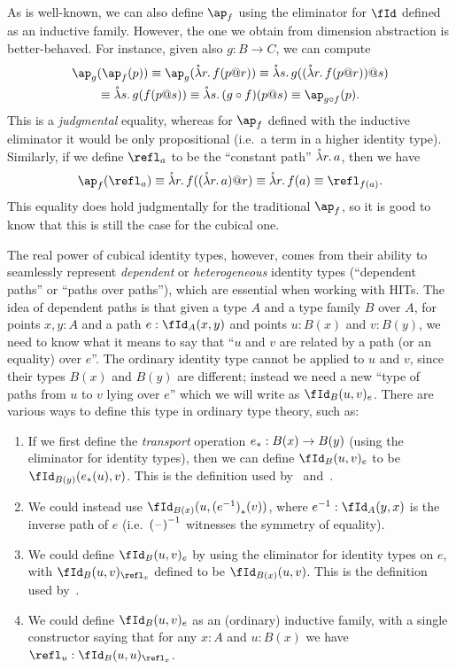 \documentclass{amsart}
\begin{document}
As is well-known, we can also define $\ap_f$ using the eliminator for $\fId$ defined as an inductive family.
However, the one we obtain from dimension abstraction is better-behaved.
For instance, given also $g:B\to C$, we can compute
\begin{multline*}
\ap_g (\ap_f(p))
\jdeq \ap_g(\dlam{r} f(p\dapp r))
\jdeq \dlam{s} g((\dlam{r} f(p\dapp r))\dapp s)\\
\jdeq \dlam{s} g(f(p\dapp s))
\jdeq \dlam{s} (g \circ f)(p\dapp s)
\jdeq \ap_{g\circ f}(p).
\end{multline*}
This is a \emph{judgmental} equality, whereas for $\ap_f$ defined with the inductive eliminator it would be only propositional (i.e.\ a term in a higher identity type).
Similarly, if we define $\refl_a$ to be the ``constant path'' $\mathring{\lambda} r.\, a$, then we have
\[ \ap_f(\refl_a)
\jdeq \dlam{r} f((\dlam{r}a)\dapp r)
\jdeq \dlam{r} f(a)
\jdeq \refl_{f(a)}.\]
This equality does hold judgmentally for the traditional $\ap_f$, so it is good to know that this is still the case for the cubical one.

The real power of cubical identity types, however, comes from their ability to seamlessly represent \emph{dependent} or \emph{heterogeneous} identity types (``dependent paths'' or ``paths over paths''), which are essential when working with HITs.
The idea of dependent paths is that given a type $A$ and a type family $B$ over $A$, for points $x,y:A$ and a path $e:\id[A]xy$ and points $u:B(x)$ and $v:B(y)$, we need to know what it means to say that ``$u$ and $v$ are related by a path (or an equality) over $e$''.
The ordinary identity type cannot be applied to $u$ and $v$, since their types $B(x)$ and $B(y)$ are different; instead we need a new ``type of paths from $u$ to $v$ lying over $e$'' which we will write as $\idover[B]{u}{v}{e}$.
There are various ways to define this type in ordinary type theory, such as:
\begin{enumerate}
\item If we first define the \emph{transport} operation ${e}_{*}:B(x) \to B(y)$ (using the eliminator for identity types), then we can define $\idover[B]{u}{v}{e}$ to be $\id[B(y)]{\transf{e}(u)}{v}$.
  This is the definition used by~\cite{hottbook} and~\cite{hottcoq}.\label{item:idover1}
\item We could instead use $\id[B(x)]{u}{\transf{(\opp{e})}(v)}$, where $\opp{e}:\id[A]{y}{x}$ is the inverse path of $e$ (i.e.\ $\mathord{{(\mathord{\hspace{1pt}\text{--}\hspace{1pt}})}^{-1}}$ witnesses the symmetry of equality).\label{item:idover2}
\item We could define $\idover[B]{u}{v}{e}$ by using the eliminator for identity types on $e$, with $\idover[B]{u}{v}{\refl_x}$ defined to be $\id[B(x)]{u}{v}$.
  This is the definition used by~\cite{hottagda}.\label{item:idover3}
\item {}
 We could define $\idover[B]{u}{v}{e}$ as an (ordinary) inductive family, with a single constructor saying that for any $x:A$ and $u:B(x)$ we have $\refl_u : \idover[B]{u}{u}{\refl_x}$.\label{item:idover4}
\end{enumerate}
\end{document}
